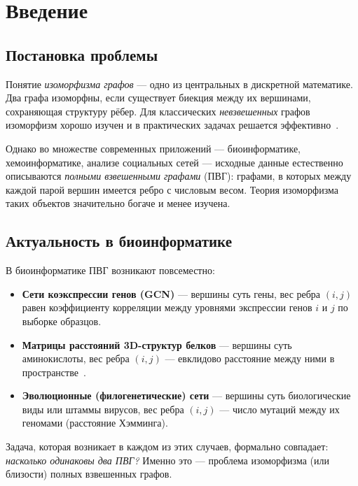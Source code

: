 
\section{Введение}

\subsection{Постановка проблемы}

Понятие \emph{изоморфизма графов} — одно из центральных в дискретной математике.
Два графа изоморфны, если существует биекция между их вершинами, сохраняющая структуру рёбер.
Для классических \emph{невзвешенных} графов изоморфизм хорошо изучен
и в практических задачах решается эффективно~\cite{bowman_graph_iso}.

Однако во множестве современных приложений — биоинформатике, хемоинформатике,
анализе социальных сетей — исходные данные естественно описываются
\emph{полными взвешенными графами} (ПВГ): графами, в которых между каждой парой
вершин имеется ребро с числовым весом.
Теория изоморфизма таких объектов значительно богаче и менее изучена.

\subsection{Актуальность в биоинформатике}

В биоинформатике ПВГ возникают повсеместно:
\begin{itemize}
    \item \textbf{Сети коэкспрессии генов (GCN)} — вершины суть гены,
          вес ребра $(i,j)$ равен коэффициенту корреляции
          между уровнями экспрессии генов $i$ и $j$ по выборке образцов.
    \item \textbf{Матрицы расстояний 3D-структур белков} —
          вершины суть аминокислоты, вес ребра $(i,j)$ ---
          евклидово расстояние между ними в пространстве~\cite{dali1993}.
    \item \textbf{Эволюционные (филогенетические) сети} —
          вершины суть биологические виды или штаммы вирусов,
          вес ребра $(i,j)$ --- число мутаций между их геномами
          (расстояние Хэмминга).
\end{itemize}

Задача, которая возникает в каждом из этих случаев, формально совпадает:
\emph{насколько одинаковы два ПВГ?}
Именно это — проблема изоморфизма (или близости) полных взвешенных графов.

